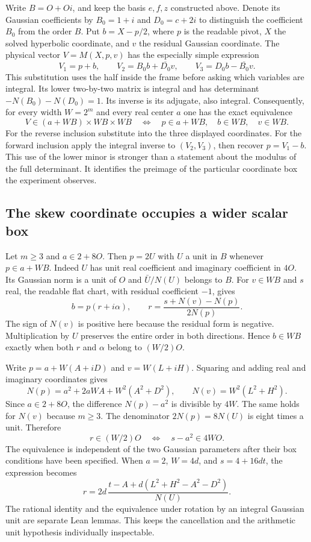 \documentclass[12pt,letterpaper]{article}
\begin{document}
Write $B=O+Oi$, and keep the basis $e,f,z$ constructed above. Denote its Gaussian coefficients by $B_0=1+i$ and $D_0=c+2i$ to distinguish the coefficient $B_0$ from the order $B$. Put $b=X-p/2$, where $p$ is the readable pivot, $X$ the solved hyperbolic coordinate, and $v$ the residual Gaussian coordinate. The physical vector $V=M(X,p,v)$ has the especially simple expression
\[
 V_1=p+b,\qquad V_2=B_0 b+\overline{D_0}v,\qquad
 V_3=D_0 b-\overline{B_0}v.
\]
This substitution uses the half inside the frame before asking which variables are integral. Its lower two-by-two matrix is integral and has determinant
$-N(B_0)-N(D_0)=1$. Its inverse is its adjugate, also integral. Consequently, for every width $W=2^m$ and every real center $a$ one has the exact equivalence
\[
 V\in (a+WB)\times WB\times WB
 \quad\Longleftrightarrow\quad
 p\in a+WB,\quad b\in WB,\quad v\in WB.
\]
For the reverse inclusion substitute into the three displayed coordinates. For the forward inclusion apply the integral inverse to $(V_2,V_3)$, then recover $p=V_1-b$. This use of the lower minor is stronger than a statement about the modulus of the full determinant. It identifies the preimage of the particular coordinate box the experiment observes.

\subsection{The skew coordinate occupies a wider scalar box}
Let $m\ge3$ and $a\in 2+8O$. Then $p=2U$ with $U$ a unit in $B$ whenever $p\in a+WB$. Indeed $U$ has unit real coefficient and imaginary coefficient in $4O$. Its Gaussian norm is a unit of $O$ and $\bar U/N(U)$ belongs to $B$. For $v\in WB$ and $s$ real, the readable flat chart, with residual coefficient $-1$, gives
\[
 b=p(r+i\alpha),\qquad
 r=\frac{s+N(v)-N(p)}{2N(p)}.
\]
The sign of $N(v)$ is positive here because the residual form is negative. Multiplication by $U$ preserves the entire order in both directions. Hence $b\in WB$ exactly when both $r$ and $\alpha$ belong to $(W/2)O$.

Write $p=a+W(A+iD)$ and $v=W(L+iH)$. Squaring and adding real and imaginary coordinates gives
\[
 N(p)=a^2+2aWA+W^2(A^2+D^2),\qquad
 N(v)=W^2(L^2+H^2).
\]
Since $a\in2+8O$, the difference $N(p)-a^2$ is divisible by $4W$. The same holds for $N(v)$ because $m\ge3$. The denominator $2N(p)=8N(U)$ is eight times a unit. Therefore
\[
 r\in (W/2)O\quad\Longleftrightarrow\quad s-a^2\in4WO.
\]
The equivalence is independent of the two Gaussian parameters after their box conditions have been specified. When $a=2$, $W=4d$, and $s=4+16dt$, the expression becomes
\[
 r=2d\,\frac{t-A+d(L^2+H^2-A^2-D^2)}{N(U)} .
\]
The rational identity and the equivalence under rotation by an integral Gaussian unit are separate Lean lemmas. This keeps the cancellation and the arithmetic unit hypothesis individually inspectable.
\end{document}
